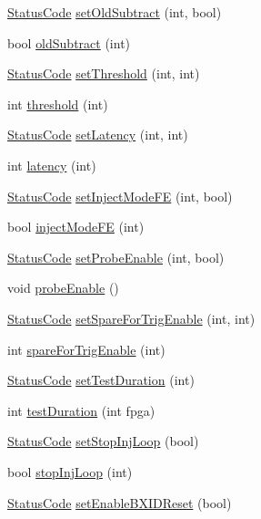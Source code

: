 \begin{DoxyCompactItemize}
\item 
\hyperlink{classStatusCode}{Status\+Code} \hyperlink{classFEB__v1_aec8198d5c03ddc5dd9151683f9506d00}{set\+Old\+Subtract} (int, bool)
\item 
bool \hyperlink{classFEB__v1_a5b277ace76b9e511c055ad94d241dd61}{old\+Subtract} (int)
\item 
\hyperlink{classStatusCode}{Status\+Code} \hyperlink{classFEB__v1_a02416559cdd68e8aa57f47ce7cf6788c}{set\+Threshold} (int, int)
\item 
int \hyperlink{classFEB__v1_a71e54700c59857844905c879e4b3d4fd}{threshold} (int)
\item 
\hyperlink{classStatusCode}{Status\+Code} \hyperlink{classFEB__v1_ae3252ed2737b5c93395da201b427b871}{set\+Latency} (int, int)
\item 
int \hyperlink{classFEB__v1_a68050d232efd8d6568910b09a2c18f62}{latency} (int)
\item 
\hyperlink{classStatusCode}{Status\+Code} \hyperlink{classFEB__v1_aea3983d847c7b8053485ddd16af65680}{set\+Inject\+Mode\+FE} (int, bool)
\item 
bool \hyperlink{classFEB__v1_adad5a9a1dc8f650a59e6edb310451cab}{inject\+Mode\+FE} (int)
\item 
\hyperlink{classStatusCode}{Status\+Code} \hyperlink{classFEB__v1_abb013a3441c02f57cea07a244554fdd5}{set\+Probe\+Enable} (int, bool)
\item 
void \hyperlink{classFEB__v1_aa9a047f616c6affac88a8d9ec984013f}{probe\+Enable} ()
\item 
\hyperlink{classStatusCode}{Status\+Code} \hyperlink{classFEB__v1_ae8e531b961f91ac974a75c43937acf78}{set\+Spare\+For\+Trig\+Enable} (int, int)
\item 
int \hyperlink{classFEB__v1_a76d86fb9e9be48e704257070675ae1cc}{spare\+For\+Trig\+Enable} (int)
\item 
\hyperlink{classStatusCode}{Status\+Code} \hyperlink{classFEB__v1_a19d3dee6fa47408cf0aa136fb99ebe1c}{set\+Test\+Duration} (int)
\item 
int \hyperlink{classFEB__v1_a7f1db8ca9490172fce7603da9e703dec}{test\+Duration} (int fpga)
\item 
\hyperlink{classStatusCode}{Status\+Code} \hyperlink{classFEB__v1_aaf8386be3d27ea22e389b0a6c7699af7}{set\+Stop\+Inj\+Loop} (bool)
\item 
bool \hyperlink{classFEB__v1_abfd23d8fbcea0415a7e8401110869a78}{stop\+Inj\+Loop} (int)
\item 
\hyperlink{classStatusCode}{Status\+Code} \hyperlink{classFEB__v1_a2ad20ff9db6a0ceef875d874bae214a9}{set\+Enable\+B\+X\+I\+D\+Reset} (bool)

\end{DoxyCompactItemize}
